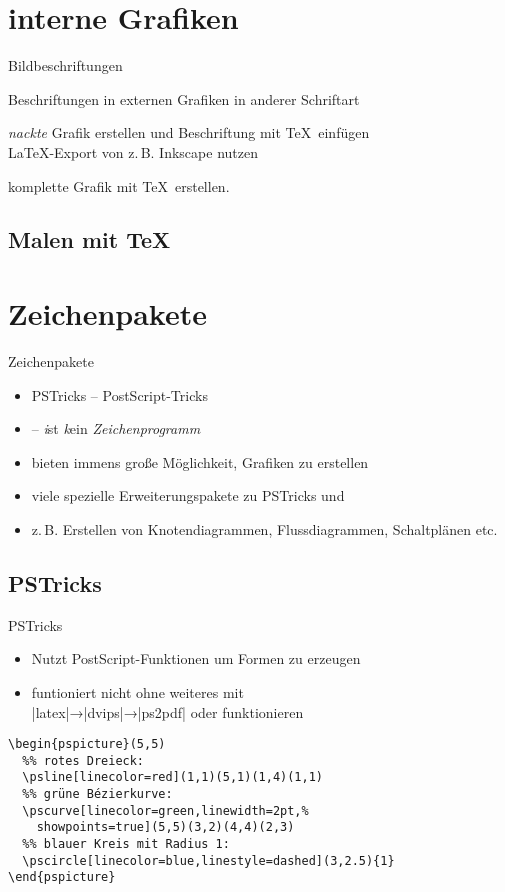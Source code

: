 \documentclass[
	vorläufig=false,
	datum=2017-11-24,
	titel={Grafiken, Abbildungen, TikZ},
	web=false,
	mo,
	aspectratio=1610,
]{../tex/latexkurs-slides}
\begin{document}
\section{interne Grafiken}
\begin{frame}{Bildbeschriftungen}
\begin{description}
\item<+->[Problem] Beschriftungen in externen Grafiken in anderer Schriftart
\item<+->[Lösung] \emph{nackte} Grafik erstellen und Beschriftung mit \TeX\ einfügen\\\LaTeX-Export von z.\,B.  Inkscape nutzen
\item<+->[Lösung] komplette Grafik mit \TeX\ erstellen.
\end{description}
\end{frame}

\subsection{Malen mit \TeX}

\section{Zeichenpakete}
\begin{frame}[fragile]{Zeichenpakete}
	\begin{itemize}
		\item PSTricks – PostScript-Tricks 
		\item \TikZ – \TikZ \emph{i}st \emph{k}ein \emph{Zeichenprogramm}
		\item bieten immens große Möglichkeit, Grafiken zu erstellen
		\item viele spezielle Erweiterungspakete zu PSTricks und \TikZ
		\item z.\,B. Erstellen von Knotendiagrammen, Flussdiagrammen, Schaltplänen etc. 
	\end{itemize}
\end{frame}

\subsection{PSTricks}
\begin{frame}[fragile]{PSTricks}
	\begin{itemize}
		\item Nutzt PostScript-Funktionen um Formen zu erzeugen
		\item funtioniert nicht ohne weiteres mit \\
		|latex|→|dvips|→|ps2pdf| oder  funktionieren
	\end{itemize}
\begin{lstlisting}
\begin{pspicture}(5,5)
  %% rotes Dreieck:
  \psline[linecolor=red](1,1)(5,1)(1,4)(1,1)
  %% grüne Bézierkurve:
  \pscurve[linecolor=green,linewidth=2pt,%
    showpoints=true](5,5)(3,2)(4,4)(2,3)
  %% blauer Kreis mit Radius 1:
  \pscircle[linecolor=blue,linestyle=dashed](3,2.5){1}
\end{pspicture}
\end{lstlisting}
\end{frame}
\end{document}
